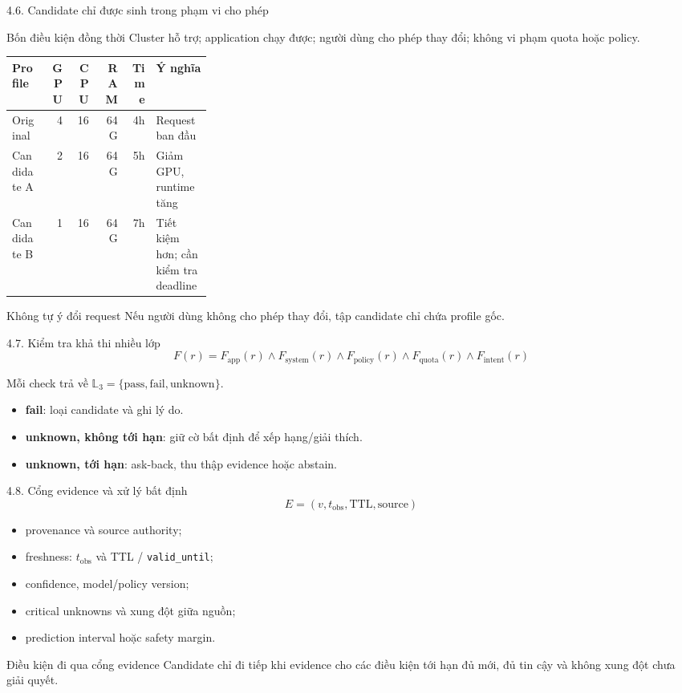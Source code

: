 \begin{frame}[t]{4.6. Candidate chỉ được sinh trong phạm vi cho phép}
\small
\begin{block}{Bốn điều kiện đồng thời}
Cluster hỗ trợ; application chạy được; người dùng cho phép thay đổi; không vi phạm quota hoặc policy.
\end{block}
\centering
\begin{tabular}{lrrrrp{0.29\linewidth}}
\toprule
\textbf{Profile} & \textbf{GPU} & \textbf{CPU} & \textbf{RAM} & \textbf{Time} & \textbf{Ý nghĩa} \\
\midrule
Original & 4 & 16 & 64G & 4h & Request ban đầu \\
Candidate A & 2 & 16 & 64G & 5h & Giảm GPU, runtime tăng \\
Candidate B & 1 & 16 & 64G & 7h & Tiết kiệm hơn; cần kiểm tra deadline \\
\bottomrule
\end{tabular}
\vspace{0.3cm}
\begin{alertblock}{Không tự ý đổi request}
Nếu người dùng không cho phép thay đổi, tập candidate chỉ chứa profile gốc.
\end{alertblock}
\end{frame}

\begin{frame}[t]{4.7. Kiểm tra khả thi nhiều lớp}
\small
\[
F(r)=F_{\mathrm{app}}(r)\land F_{\mathrm{system}}(r)\land
F_{\mathrm{policy}}(r)\land F_{\mathrm{quota}}(r)\land F_{\mathrm{intent}}(r)
\]
\begin{center}
Mỗi check trả về $\mathbb{L}_3=\{\mathrm{pass},\mathrm{fail},\mathrm{unknown}\}$.
\end{center}
\begin{itemize}
  \item \textbf{fail}: loại candidate và ghi lý do.
  \item \textbf{unknown, không tới hạn}: giữ cờ bất định để xếp hạng/giải thích.
  \item \textbf{unknown, tới hạn}: ask-back, thu thập evidence hoặc abstain.
\end{itemize}
\end{frame}

\begin{frame}[t]{4.8. Cổng evidence và xử lý bất định}
\small
\[
E=(v,t_{\mathrm{obs}},\mathrm{TTL},\mathrm{source})
\]
\begin{itemize}
  \item provenance và source authority;
  \item freshness: $t_{\mathrm{obs}}$ và TTL / \texttt{valid\_until};
  \item confidence, model/policy version;
  \item critical unknowns và xung đột giữa nguồn;
  \item prediction interval hoặc safety margin.
\end{itemize}
\begin{alertblock}{Điều kiện đi qua cổng evidence}
Candidate chỉ đi tiếp khi evidence cho các điều kiện tới hạn đủ mới, đủ tin cậy và không xung đột chưa giải quyết.
\end{alertblock}
\end{frame}

